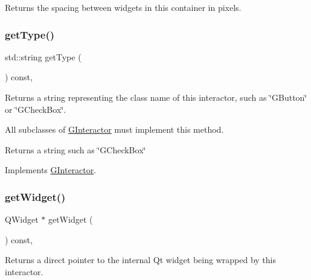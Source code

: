 Returns the spacing between widgets in this container in pixels. 

\mbox{\label{classsgl_1_1GContainer_a9b72ede4ee8520f987a0c01e30654814}} 
\subsubsection{\texorpdfstring{get\+Type()}{getType()}}
{\footnotesize\ttfamily std\+::string get\+Type (\begin{DoxyParamCaption}{ }\end{DoxyParamCaption}) const\hspace{0.3cm}{\ttfamily [override]}, {\ttfamily [virtual]}}



Returns a string representing the class name of this interactor, such as \char`\"{}\+G\+Button\char`\"{} or \char`\"{}\+G\+Check\+Box\char`\"{}. 

All subclasses of \mbox{\hyperlink{classsgl_1_1GInteractor}{G\+Interactor}} must implement this method. \begin{DoxyReturn}{Returns}
a string such as \char`\"{}\+G\+Check\+Box\char`\"{} 
\end{DoxyReturn}


Implements \mbox{\hyperlink{classsgl_1_1GInteractor_a44c407a54a20dd0f2fff30338289299d}{G\+Interactor}}.

\mbox{\label{classsgl_1_1GContainer_a3b33a602b31a6b809d020535a59db3b4}} 
\subsubsection{\texorpdfstring{get\+Widget()}{getWidget()}}
{\footnotesize\ttfamily Q\+Widget $\ast$ get\+Widget (\begin{DoxyParamCaption}{ }\end{DoxyParamCaption}) const\hspace{0.3cm}{\ttfamily [override]}, {\ttfamily [virtual]}}



Returns a direct pointer to the internal Qt widget being wrapped by this interactor. 

